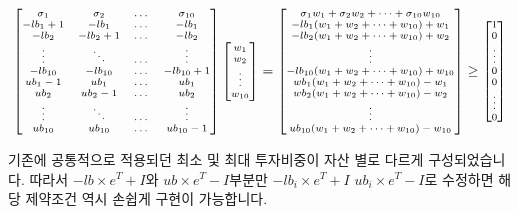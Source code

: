 \documentclass[12pt,]{book}
\begin{document}
\[ \scriptsize \begin{bmatrix}
 \sigma_1 & \sigma_2 & \dots & \sigma_{10} \\ -lb_1 + 1 & -lb_1 & \dots & -lb_1 \\ -lb_2  & -lb_2 + 1 & \dots & -lb_2 \\ \vdots & \ddots & \dots & \vdots \\
-lb_{10} & -lb_{10} & \dots & -lb_{10} + 1 \\ ub_1 - 1 & ub_1 & \dots & ub_1 \\ ub_2  & ub_2 - 1 & \dots & ub_2 \\ \vdots & \ddots & \dots  & \vdots \\
ub_{10} & ub_{10} & \dots & ub_{10} - 1 \end{bmatrix}
\begin{bmatrix} w_1 \\ w_2 \\ \vdots \\ w_{10} \end{bmatrix} = 
\begin{bmatrix} \sigma_1w_1 + \sigma_2w_2 + \dots + \sigma_{10}w_{10} \\ -lb_1(w_1 + w_2 + \dots + w_{10}) + w_1 \\ -lb_2(w_1 + w_2 + \dots + w_{10}) + w_2\\ \vdots \\ -lb_{10}(w_1 + w_2 + \dots + w_{10}) + w_{10} \\
wb_1(w_1 + w_2 + \dots + w_{10}) - w_1 \\ wb_2(w_1 + w_2 + \dots + w_{10}) - w_2 \\ \vdots \\
ub_{10}(w_1 + w_2 + \dots + w_{10}) - w_{10}
\end{bmatrix} \ge \begin{bmatrix} 1 \\ 0 \\ \vdots \\ 0 \\ 0 \\ \vdots \\ 0 \end{bmatrix} \]

기존에 공통적으로 적용되던 최소 및 최대 투자비중이 자산 별로 다르게 구성되었습니다. 따라서 \(-lb \times e^T + I\)와 \(ub \times e^T - I\)부분만 \(-lb_i \times e^T + I\) \(ub_i \times e^T - I\)로 수정하면 해당 제약조건 역시 손쉽게 구현이 가능합니다.
\end{document}
